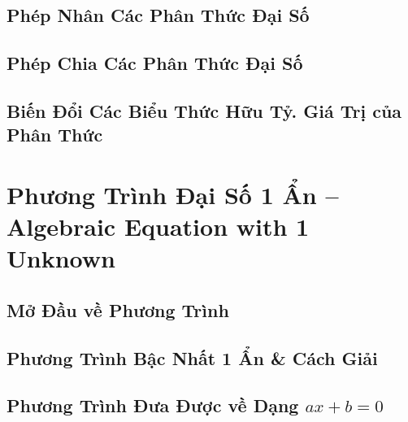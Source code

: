 \documentclass{article}
\numberwithin{equation}{section}
\begin{document}

\subsection{Phép Nhân Các Phân Thức Đại Số}


\subsection{Phép Chia Các Phân Thức Đại Số}


\subsection{Biến Đổi Các Biểu Thức Hữu Tỷ. Giá Trị của Phân Thức}


\section{Phương Trình Đại Số 1 Ẩn -- Algebraic Equation with 1 Unknown}

\subsection{Mở Đầu về Phương Trình}


\subsection{Phương Trình Bậc Nhất 1 Ẩn \& Cách Giải}


\subsection{Phương Trình Đưa Được về Dạng $ax + b = 0$}

\end{document}
